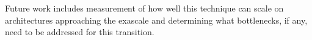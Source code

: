 \documentclass[10pt,journal,cspaper,compsoc]{IEEEtran}
\begin{document}
Future work includes measurement of how well this technique can scale on architectures approaching the exascale and determining what bottlenecks, if any, need to be addressed for this transition. 



%
%



%
%
\end{document}
